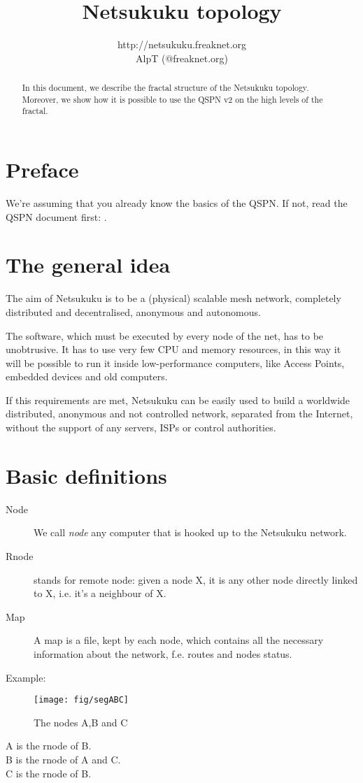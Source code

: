 \documentclass[a4paper]{article}
\title{Netsukuku topology}
\author{http://netsukuku.freaknet.org\\AlpT (@freaknet.org)}
\begin{document}
\maketitle

\begin{abstract}
	In this document, we describe the fractal structure of the Netsukuku
	topology. Moreover, we show how it is possible to use the QSPN v2 on
	the high levels of the fractal.
\end{abstract}

\section{Preface}
\label{sec:preface}

We're assuming that you already know the basics of the QSPN. If not, read the
QSPN document first: \cite{qspndoc}.

\section{The general idea}
\label{sec:general_idea}

The aim of Netsukuku is to be a (physical) scalable mesh network, completely
distributed and decentralised, anonymous and autonomous.

The software, which must be executed by every node of the net, has to be
unobtrusive. It has to use very few CPU and memory resources, in this way it
will be possible to run it inside low-performance computers, like Access Points,
embedded devices and old computers.

If this requirements are met, Netsukuku can be easily used to build a worldwide
distributed, anonymous and not controlled network, separated from the
Internet, without the support of any servers, ISPs or control authorities.

\section{Basic definitions}

\begin{description}
	\item[Node] We call \emph{node} any computer that is hooked up to the
		Netsukuku network.
	\item[Rnode] stands for remote node: given a node X, it is any other
		node directly linked to X, i.e. it's a neighbour of X.
	\item[Map] A map is a file, kept by each node, which contains all the
		necessary information about the network, f.e. routes and nodes
		status.
\end{description}
Example:\\
\begin{figure}[h]
	\begin{center}
		\texttt{[image: fig/segABC]}
	\end{center}
	\caption{The nodes A,B and C}
\end{figure}
A is the rnode of B.\\
B is the rnode of A and C.\\
C is the rnode of B.
\end{document}
